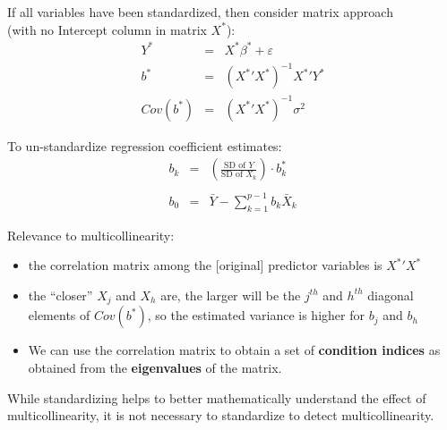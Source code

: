 \documentclass[12pt]{notes}
\begin{document}
If all variables have been standardized, then consider matrix approach\\
(with no Intercept column in matrix $X^*$):
\begin{eqnarray}
  Y^* & = & X^* \beta^* + \varepsilon \nonumber \\
  b^* & = & ( {X^*}' X^*)^{-1} {X^*}' Y^* \nonumber \\
  Cov(b^*) & = & ({X^*}' {X^*})^{-1} \sigma^2 \nonumber
\end{eqnarray}

\begin{minipage}[l][2cm][c]{\textwidth}
\begin{comment}
\end{comment}
\end{minipage}

To un-standardize regression coefficient estimates:
\begin{eqnarray}
   b_k & = & \left( \frac{\mbox{SD of $Y$}}{\mbox{SD of $X_k$}} \right) \cdot b^*_k \nonumber \\
    & \nonumber \\
   b_0 & = & \bar{Y} - \sum_{k=1}^{p-1} b_k \bar{X}_k \nonumber
\end{eqnarray}

\nspace
Relevance to multicollinearity:
\begin{itemize}
  \item  the correlation matrix among the [original] predictor variables is ${X^*}'X^*$
  \item  the ``closer'' $X_j$ and $X_h$ are, the larger will be the
$j^{th}$ and $h^{th}$ diagonal elements of $Cov(b^*)$, so the estimated variance
is higher for $b_j$ and $b_h$
\item We can use the correlation matrix to obtain a set of \textbf{condition indices} as obtained from the \textbf{eigenvalues} of the matrix. 
\end{itemize}

\nspace
While standardizing helps to better mathematically understand the effect of multicollinearity, it is not necessary to standardize to detect multicollinearity. 
\nspace


\begin{minipage}[l][2cm][c]{\textwidth}
\begin{comment}
\end{comment}
\end{minipage}
\end{document}
